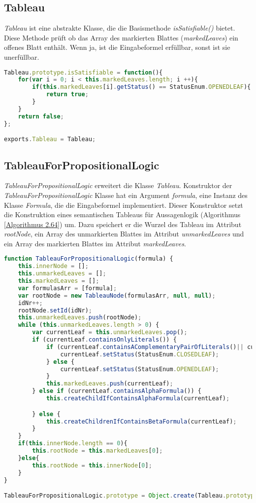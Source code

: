 \subsection{Tableau}
\textit{Tableau} ist eine abstrakte Klasse, die die Basismethode \textit{isSatisfiable()} bietet. Diese Methode prüft ob das Array des markierten Blattes (\textit{markedLeaves}) ein offenes Blatt enthält. Wenn ja, ist die Eingabeformel erfüllbar, sonst ist sie unerfüllbar.

\begin{lstlisting}[language=JavaScript, caption= isSatisfiable() (Klasse Tableau), basicstyle=\scriptsize] 
Tableau.prototype.isSatisfiable = function(){
    for(var i = 0; i < this.markedLeaves.length; i ++){
        if(this.markedLeaves[i].getStatus() == StatusEnum.OPENEDLEAF){
            return true;
        }
    }
    return false;
};

exports.Tableau = Tableau;
\end{lstlisting}

\subsection{TableauForPropositionalLogic}
\textit{TableauForPropositionalLogic} erweitert die Klasse \textit{Tableau}. Konstruktor der \textit{TableauForPropositionalLogic} Klasse hat ein Argument \textit{formula}, eine Instanz des Klasse \textit{Formula}, die die Eingabeformel implementiert. Dieser Konstruktor setzt die Konstruktion eines semantischen Tableaus für Aussagenlogik (Algorithmus \ref{Algorithmus 2.64}) um. Dazu speichert er die Wurzel des Tableau im Attribut \textit{rootNode}, ein Array des unmarkierten Blattes im Attribut \textit{unmarkedLeaves} und ein Array des markierten Blattes im Attribut \textit{markedLeaves}.
\begin{lstlisting}[language=JavaScript, caption= TableauForPropositionalLogic Konstruktor, basicstyle=\scriptsize] 
function TableauForPropositionalLogic(formula) {
    this.innerNode = [];
    this.unmarkedLeaves = [];
    this.markedLeaves = [];
    var formulasArr = [formula];
    var rootNode = new TableauNode(formulasArr, null, null);
    idNr++;
    rootNode.setId(idNr);
    this.unmarkedLeaves.push(rootNode);
    while (this.unmarkedLeaves.length > 0) {
        var currentLeaf = this.unmarkedLeaves.pop();
        if (currentLeaf.containsOnlyLiterals()) {
            if (currentLeaf.containsAComplementaryPairOfLiterals()|| currentLeaf.containsConstantFalse()) {
                currentLeaf.setStatus(StatusEnum.CLOSEDLEAF);
            } else {
                currentLeaf.setStatus(StatusEnum.OPENEDLEAF);
            }
            this.markedLeaves.push(currentLeaf);
        } else if (currentLeaf.containsAlphaFormula()) {
            this.createChildIfContainsAlphaFormula(currentLeaf);

        } else {
            this.createChildrenIfContainsBetaFormula(currentLeaf);
        }
    }
    if(this.innerNode.length == 0){
        this.rootNode = this.markedLeaves[0];
    }else{
        this.rootNode = this.innerNode[0];
    }
}

TableauForPropositionalLogic.prototype = Object.create(Tableau.prototype);
\end{lstlisting}

